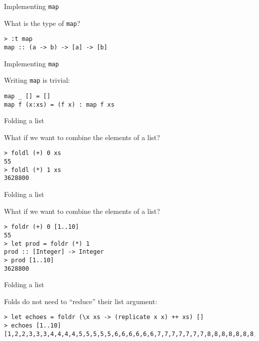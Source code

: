 %
\begin{frame}[fragile]{Implementing \texttt{map}}

What is the type of \texttt{map}?

\begin{block}{}
\begin{verbatim}
> :t map
map :: (a -> b) -> [a] -> [b]
\end{verbatim}
\end{block}

\end{frame}

%
\begin{frame}[fragile]{Implementing \texttt{map}}

Writing \texttt{map} is trivial:

\begin{block}{}
\begin{verbatim}
map _ [] = []
map f (x:xs) = (f x) : map f xs
\end{verbatim}
\end{block}

\end{frame}

%
\begin{frame}[fragile]{Folding a list}

What if we want to combine the elements of a list?

\begin{block}{}
\begin{verbatim}
> foldl (+) 0 xs
55
> foldl (*) 1 xs
3628800
\end{verbatim}
\end{block}

\end{frame}

%
\begin{frame}[fragile]{Folding a list}

What if we want to combine the elements of a list?

\begin{block}{}
\begin{verbatim}
> foldr (+) 0 [1..10]
55
> let prod = foldr (*) 1
prod :: [Integer] -> Integer
> prod [1..10]
3628800
\end{verbatim}
\end{block}

\end{frame}

%
\begin{frame}[fragile]{Folding a list}

Folds do not need to ``reduce'' their list argument:

\begin{block}{}
\begin{verbatim}
> let echoes = foldr (\x xs -> (replicate x x) ++ xs) []
> echoes [1..10] [1,2,2,3,3,3,4,4,4,4,5,5,5,5,5,6,6,6,6,6,6,7,7,7,7,7,7,7,8,8,8,8,8,8,8,8,9,9,9,9,9,9,9,9,9,10,10,10,10,10,10,10,10,10,10]
\end{verbatim}
\end{block}

\end{frame}

